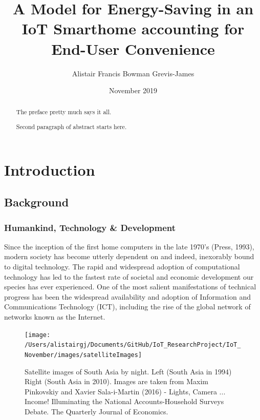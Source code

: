 \documentclass[11pt,]{article}
\title{A Model for Energy-Saving in an IoT Smarthome accounting for End-User
Convenience}
\author{Alistair Francis Bowman Grevis-James}
\date{November 2019}
\begin{document}
\maketitle
\begin{abstract}
The preface pretty much says it all.

\par

Second paragraph of abstract starts here. \pagebreak
\end{abstract}

{
\setcounter{tocdepth}{3}
\tableofcontents
}
\pagebreak

\hypertarget{introduction}{%
\section{Introduction}\label{introduction}}

\hypertarget{background}{%
\subsection{Background}\label{background}}

\hypertarget{humankind-technology-development}{%
\subsubsection{Humankind, Technology \&
Development}\label{humankind-technology-development}}

Since the inception of the first home computers in the late 1970's
(Press, 1993), modern society has become utterly dependent on and
indeed, inexorably bound to digital technology. The rapid and widespread
adoption of computational technology has led to the fastest rate of
societal and economic development our species has ever experienced. One
of the most salient manifestations of technical progress has been the
widespread availability and adoption of Information and Communications
Technology (ICT), including the rise of the global network of networks
known as the Internet.

\begin{figure}[H]

{\centering \texttt{[image: /Users/alistairgj/Documents/GitHub/IoT\_ResearchProject/IoT\_November/images/satelliteImages]} 

}

\caption{Satellite images of South Asia by night. Left (South Asia in 1994) Right (South Asia in 2010). Images are taken from Maxim Pinkovskiy and Xavier Sala-i-Martin (2016) - Lights, Camera ... Income! Illuminating the National Accounts-Household Surveys Debate. The Quarterly Journal of Economics.}\label{fig:satelliteImagesAsia}
\end{figure}
\end{document}
